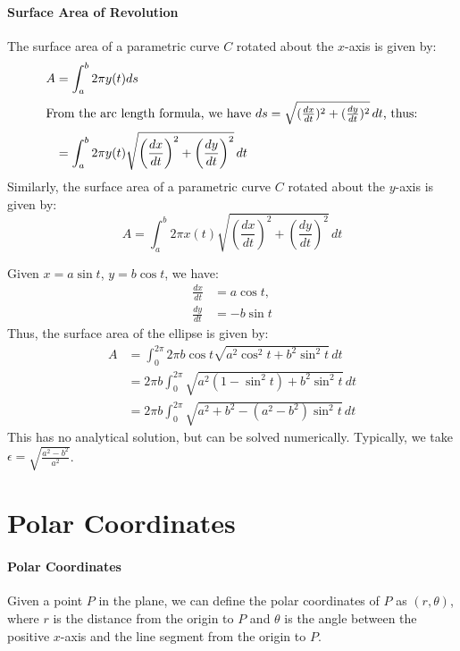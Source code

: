 \documentclass[11pt]{report}
\begin{document}
\paragraph{Surface Area of Revolution} The surface area of a parametric curve $C$ rotated about the $x$-axis is given by:
\begin{align}
    A &= \int_a^b 2\pi y(t) ds \nonumber \\
    \intertext{From the arc length formula, we have $ds = \sqrt{(\frac{dx}{dt})^2 + (\frac{dy}{dt})^2} \, dt$, thus:}
    &= \int_a^b 2\pi y(t) \sqrt{\left(\frac{dx}{dt}\right)^2 + \left(\frac{dy}{dt}\right)^2} \, dt
\end{align}
Similarly, the surface area of a parametric curve $C$ rotated about the $y$-axis is given by:
\begin{equation}
    A = \int_a^b 2\pi x(t) \sqrt{\left(\frac{dx}{dt}\right)^2 + \left(\frac{dy}{dt}\right)^2} \, dt
\end{equation}
\begin{example}
    Given $x = a\sin t$, $y = b\cos t$, we have:
    \begin{align*}
        \frac{dx}{dt} &= a\cos t, \\
        \frac{dy}{dt} &= -b\sin t
    \end{align*}
    Thus, the surface area of the ellipse is given by:
    \begin{align*}
        A &= \int_0^{2\pi} 2\pi b\cos t \sqrt{a^2\cos^2 t + b^2\sin^2 t} \, dt \\
        &= 2\pi b \int_0^{2\pi} \sqrt{a^2 (1 - \sin^2 t) + b^2 \sin^2 t} \, dt \\
        &= 2\pi b \int_0^{2\pi} \sqrt{a^2 + b^2 - (a^2 - b^2)\sin^2 t} \, dt
    \end{align*}
    This has no analytical solution, but can be solved numerically. Typically, we take $\epsilon = \sqrt{\frac{a^2-b^2}{a^2}}$.
\end{example}
\section{Polar Coordinates}
\paragraph{Polar Coordinates} Given a point $P$ in the plane, we can define the polar coordinates of $P$ as $(r, \theta)$, where $r$ is the distance from the origin to $P$ and $\theta$ is the angle between the positive $x$-axis and the line segment from the origin to $P$.
\end{document}

